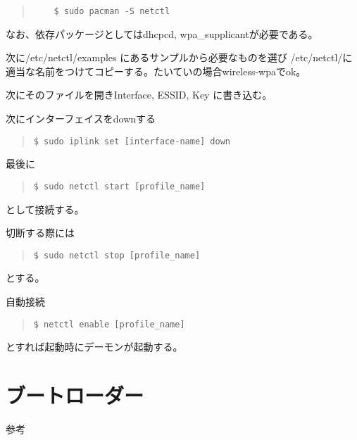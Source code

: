 \documentclass[dvipdfmx]{jsarticle}
\begin{document}
\begin{quote}
    \begin{verbatim}
	$ sudo pacman -S netctl
    \end{verbatim}
\end{quote}

なお、依存パッケージとしてはdhcpcd, wpa\_supplicantが必要である。

次に/etc/netctl/examples にあるサンプルから必要なものを選び 
/etc/netctl/に適当な名前をつけてコピーする。たいていの場合wireless-wpaでok。

次にそのファイルを開きInterface, ESSID, Key に書き込む。

次にインターフェイスをdownする

\begin{quote}
    \begin{verbatim}
$ sudo iplink set [interface-name] down
    \end{verbatim}
\end{quote}


最後に

\begin{quote}
    \begin{verbatim}
$ sudo netctl start [profile_name]
    \end{verbatim}
\end{quote}
 
として接続する。

切断する際には

\begin{quote}
    \begin{verbatim}
$ sudo netctl stop [profile_name]
    \end{verbatim}
\end{quote}


とする。

自動接続

\begin{quote}
    \begin{verbatim}
$ netctl enable [profile_name]
    \end{verbatim}
\end{quote}


とすれば起動時にデーモンが起動する。



\section{ブートローダー}

参考
\end{document}
